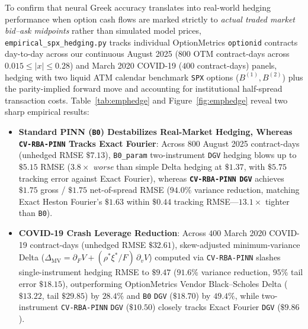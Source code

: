\documentclass[preprint,12pt]{elsarticle}
\begin{document}
To confirm that neural Greek accuracy translates into real-world hedging performance when option cash flows are marked strictly to \emph{actual traded market bid--ask midpoints} rather than simulated model prices, \texttt{empirical\_spx\_hedging.py} tracks individual OptionMetrics \texttt{optionid} contracts day-to-day across our continuous August 2025 ($800$ OTM contract-days across $0.015 \le |x| \le 0.28$) and March 2020 COVID-19 ($400$ contract-days) panels, hedging with two liquid ATM calendar benchmark \texttt{SPX} options ($B^{(1)}, B^{(2)}$) plus the parity-implied forward move and accounting for institutional half-spread transaction costs. Table~\ref{tab:emphedge} and Figure~\ref{fig:emphedge} reveal two sharp empirical results:
\begin{itemize}
  \item \textbf{Standard PINN (\texttt{B0}) Destabilizes Real-Market Hedging, Whereas \texttt{CV-RBA-PINN} Tracks Exact Fourier}: Across $800$ August 2025 contract-days (unhedged RMSE $\$7.13$), \texttt{B0\_param} two-instrument \texttt{DGV} hedging blows up to $\mathbf{\$5.15}$ RMSE ($3.8\times$ \emph{worse} than simple Delta hedging at $\$1.37$, with $\$5.75$ tracking error against Exact Fourier), whereas \textbf{\texttt{CV-RBA-PINN} \texttt{DGV}} achieves $\mathbf{\$1.75}$ gross / $\mathbf{\$1.75}$ net-of-spread RMSE ($\mathbf{94.0\%}$ variance reduction, matching Exact Heston Fourier's $\$1.63$ within $\mathbf{\$0.44}$ tracking RMSE---$\mathbf{13.1\times}$ tighter than \texttt{B0}).
  \item \textbf{COVID-19 Crash Leverage Reduction}: Across $400$ March 2020 COVID-19 contract-days (unhedged RMSE $\$32.61$), skew-adjusted minimum-variance Delta ($\Delta_{\mathrm{MV}} = \partial_F V + (\rho^*\xi^*/F)\,\partial_v V$) computed via \texttt{CV-RBA-PINN} slashes single-instrument hedging RMSE to $\mathbf{\$9.47}$ ($\mathbf{91.6\%}$ variance reduction, $95\%$ tail error $\$18.15$), outperforming OptionMetrics Vendor Black--Scholes Delta ($\$13.22$, tail $\$29.85$) by $\mathbf{28.4\%}$ and \texttt{B0} \texttt{DGV} ($\$18.70$) by $\mathbf{49.4\%}$, while two-instrument \texttt{CV-RBA-PINN} \texttt{DGV} ($\$10.50$) closely tracks Exact Fourier \texttt{DGV} ($\$9.86$).
\end{itemize}
\end{document}
